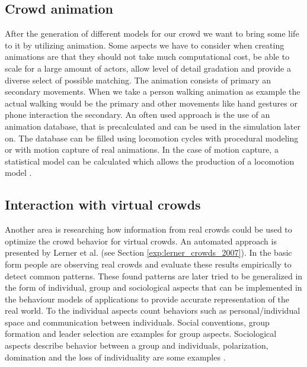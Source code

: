 \documentclass{acmsiggraph}               %
\begin{document}

\subsection{Crowd animation}

After the generation of different models for our crowd we want to bring some life to it by utilizing animation. Some aspects we have to consider when creating animations are that they should not take much computational cost, be able to scale for a large amount of actors, allow level of detail gradation and provide a diverse select of possible matching. The animation consists of primary an secondary movements. When we take a person walking animation as example the actual walking would be the primary and other movements like hand gestures or phone interaction the secondary.
An often used approach is the use of an animation database, that is precalculated and can be used in the simulation later on. The database can be filled using locomotion cycles with procedural modeling or with motion capture of real animations. In the case of motion capture, a statistical model can be calculated which allows the production of a locomotion model \cite{thalmann_crowd_2013}.

\subsection{Interaction with virtual crowds}

Another area is researching how information from real crowds could be used to optimize the crowd behavior for virtual crowds. An automated approach is presented by Lerner et al.  (see Section \ref{exp:lerner_crowds_2007}). In the basic form people are observing real crowds and evaluate these results empirically to detect common patterns. These found patterns are later tried to be generalized in the form of individual, group and sociological aspects that can be implemented in the behaviour models of applications to provide accurate representation of the real world. To the individual aspects count behaviors such as personal/individual space and communication between individuals. Social conventions, group formation and leader selection are examples for group aspects. Sociological aspects describe behavior between a group and individuals, polarization, domination and the loss of individuality are some examples \cite{benesch_atlas_1995} \cite{jeffrey_social_conventions_1998} \cite{mannoni_psychologie_1994}.  
\end{document}

